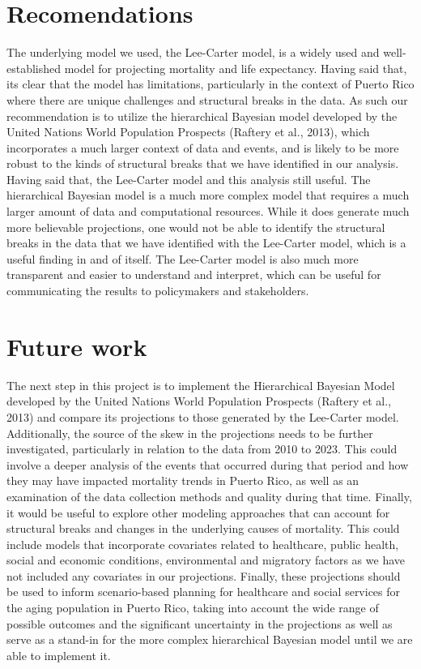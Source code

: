 \documentclass[
  12pt,
]{report}
\begin{document}
\chapter{Recomendations}\label{recomendations}

The underlying model we used, the Lee-Carter model, is a widely used and
well-established model for projecting mortality and life expectancy.
Having said that, its clear that the model has limitations, particularly
in the context of Puerto Rico where there are unique challenges and
structural breaks in the data. As such our recommendation is to utilize
the hierarchical Bayesian model developed by the United Nations World
Population Prospects (Raftery et al., 2013), which incorporates a much
larger context of data and events, and is likely to be more robust to
the kinds of structural breaks that we have identified in our analysis.
Having said that, the Lee-Carter model and this analysis still useful.
The hierarchical Bayesian model is a much more complex model that
requires a much larger amount of data and computational resources. While
it does generate much more believable projections, one would not be able
to identify the structural breaks in the data that we have identified
with the Lee-Carter model, which is a useful finding in and of itself.
The Lee-Carter model is also much more transparent and easier to
understand and interpret, which can be useful for communicating the
results to policymakers and stakeholders.

\chapter{Future work}\label{future-work}

The next step in this project is to implement the Hierarchical Bayesian
Model developed by the United Nations World Population Prospects
(Raftery et al., 2013) and compare its projections to those generated by
the Lee-Carter model. Additionally, the source of the skew in the
projections needs to be further investigated, particularly in relation
to the data from 2010 to 2023. This could involve a deeper analysis of
the events that occurred during that period and how they may have
impacted mortality trends in Puerto Rico, as well as an examination of
the data collection methods and quality during that time. Finally, it
would be useful to explore other modeling approaches that can account
for structural breaks and changes in the underlying causes of mortality.
This could include models that incorporate covariates related to
healthcare, public health, social and economic conditions, environmental
and migratory factors as we have not included any covariates in our
projections. Finally, these projections should be used to inform
scenario-based planning for healthcare and social services for the aging
population in Puerto Rico, taking into account the wide range of
possible outcomes and the significant uncertainty in the projections as
well as serve as a stand-in for the more complex hierarchical Bayesian
model until we are able to implement it.
\end{document}

